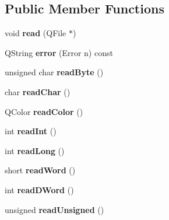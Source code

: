 \subsection*{Public Member Functions}
\begin{DoxyCompactItemize}
\item 
\mbox{\label{class_ms_1_1_capella_a3e1b4dd4863f1d0c0e1d25185396ceb4}} 
void {\bfseries read} (Q\+File $\ast$)
\item 
\mbox{\label{class_ms_1_1_capella_a9f143011804fd2a8652ba085c09db911}} 
Q\+String {\bfseries error} (Error n) const
\item 
\mbox{\label{class_ms_1_1_capella_a64568d7b84913749314ed6e3f6b71f8e}} 
unsigned char {\bfseries read\+Byte} ()
\item 
\mbox{\label{class_ms_1_1_capella_a2116ee0fee64380ba170bfeb3862e069}} 
char {\bfseries read\+Char} ()
\item 
\mbox{\label{class_ms_1_1_capella_aa9274f87d3c9c3bac8caedb1cffe474f}} 
Q\+Color {\bfseries read\+Color} ()
\item 
\mbox{\label{class_ms_1_1_capella_adcb3705e38638e0830a6b2beec22f6ea}} 
int {\bfseries read\+Int} ()
\item 
\mbox{\label{class_ms_1_1_capella_a51e1cf2490389f429c1c7e7aed03d074}} 
int {\bfseries read\+Long} ()
\item 
\mbox{\label{class_ms_1_1_capella_a35343fca2fdbc7d19d2719381ad47984}} 
short {\bfseries read\+Word} ()
\item 
\mbox{\label{class_ms_1_1_capella_ab8ad28e44cf0a8fc62bc181fc155e6eb}} 
int {\bfseries read\+D\+Word} ()
\item 
\mbox{\label{class_ms_1_1_capella_a26ee71252d75b6fcccdd915115d538e6}} 
unsigned {\bfseries read\+Unsigned} ()
\item 
\mbox{\label{class_ms_1_1_capella_a6afc0a455c8664cfa2ff3e4d4277fa8b}} 

\end{DoxyCompactItemize}
